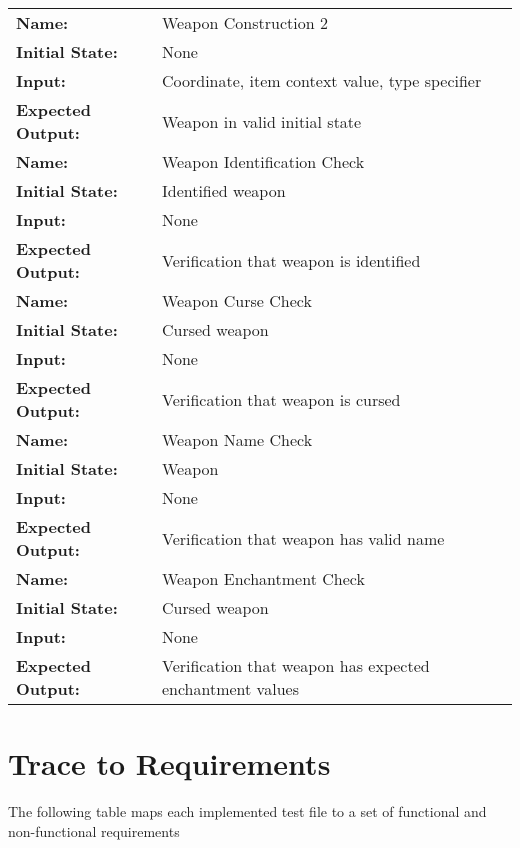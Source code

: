 \documentclass[12pt, titlepage]{article}
\newcommand{\newsection}[1]{
  \newpage
  \section{#1}
}
\begin{document}
\begin{center}
\begin{longtable}{ l | p{10cm} }
				\hline
				\rule{0pt}{1.5em}\textbf{Name:} & Weapon Construction 2\\
				\textbf{Initial State:} & None\\
				\textbf{Input:} & Coordinate, item context value, type specifier\\
				\textbf{Expected Output:} & Weapon in valid initial state\\[0.6em]
				\hline
				\rule{0pt}{1.5em}\textbf{Name:} & Weapon Identification Check\\
				\textbf{Initial State:} & Identified weapon\\
				\textbf{Input:} & None\\
				\textbf{Expected Output:} & Verification that weapon is identified\\[0.6em]
				\hline
				\rule{0pt}{1.5em}\textbf{Name:} & Weapon Curse Check\\
				\textbf{Initial State:} & Cursed weapon\\
				\textbf{Input:} & None\\
				\textbf{Expected Output:} & Verification that weapon is cursed\\[0.6em]
				\hline
				\rule{0pt}{1.5em}\textbf{Name:} & Weapon Name Check\\
				\textbf{Initial State:} & Weapon\\
				\textbf{Input:} & None\\
				\textbf{Expected Output:} & Verification that weapon has valid name\\[0.6em]
				\hline
				\rule{0pt}{1.5em}\textbf{Name:} & Weapon Enchantment Check\\
				\textbf{Initial State:} & Cursed weapon\\
				\textbf{Input:} & None\\
				\textbf{Expected Output:} & Verification that weapon has expected enchantment values\\[0.6em]
				\hline

			\end{longtable}

		\end{center}

\newsection{Trace to Requirements} \label{Section_R_Trace}

	The following table maps each implemented test file to a set of functional and non-functional requirements 
\end{document}
